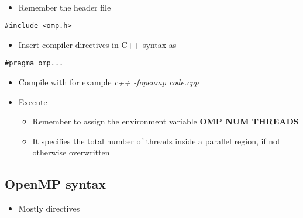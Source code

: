 \documentclass[%
oneside,                 %
final,                   %
10pt]{article}
\begin{document}
\paragraph{}
\begin{itemize}
 \item Remember the header file 
\end{itemize}

\noindent


\begin{verbatim}
#include <omp.h>

\end{verbatim}

\begin{itemize}
 \item Insert compiler directives in C++ syntax as 
\end{itemize}

\noindent


\begin{verbatim}
#pragma omp...

\end{verbatim}

\begin{itemize}
\item Compile with for example \emph{c++ -fopenmp code.cpp}

\item Execute
\begin{itemize}

  \item Remember to assign the environment variable \textbf{OMP NUM THREADS}

  \item It specifies the total number of threads inside a parallel region, if not otherwise overwritten
\end{itemize}

\noindent
\end{itemize}

\noindent



\subsection*{OpenMP syntax}
\begin{itemize}
\item Mostly directives
\end{itemize}
\end{document}
